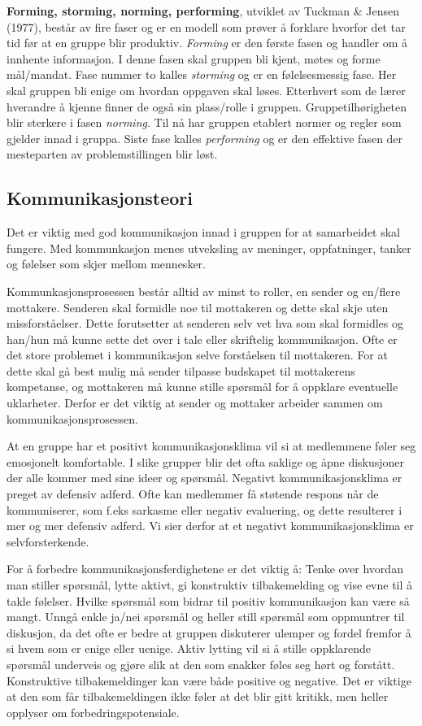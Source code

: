 \textbf{Forming, storming, norming, performing}, utviklet av Tuckman \& Jensen (1977), består av fire faser og er en modell som prøver å forklare hvorfor det tar tid før at en gruppe blir produktiv.
\textit{Forming} er den første fasen og handler om å innhente informasjon. 
I denne fasen skal gruppen bli kjent, møtes og forme mål/mandat.
Fase nummer to kalles \textit{storming} og er en følelsesmessig fase. 
Her skal gruppen bli enige om hvordan oppgaven skal løses. 
Etterhvert som de lærer hverandre å kjenne finner de også sin plass/rolle i gruppen. 
Gruppetilhørigheten blir sterkere i fasen \textit{norming}. 
Til nå har gruppen etablert normer og regler som gjelder innad i gruppa. 
Siste fase kalles \textit{performing} og er den effektive fasen der mesteparten av problemstillingen blir løst. 

\subsection{Kommunikasjonsteori}
Det er viktig med god kommunikasjon innad i gruppen for at samarbeidet skal fungere. 
Med kommunkasjon menes utveksling av meninger, oppfatninger, tanker og følelser som skjer mellom mennesker.

Kommunkasjonsprosessen består alltid av minst to roller, en sender og en/flere mottakere. 
Senderen skal formidle noe til mottakeren og dette skal skje uten missforståelser. 
Dette forutsetter at senderen selv vet hva som skal formidles og han/hun må kunne sette det over i tale eller skriftelig kommunikasjon. 
Ofte er det store problemet i kommunikasjon selve forståelsen til mottakeren. 
For at dette skal gå best mulig må sender tilpasse budskapet til mottakerens kompetanse, og mottakeren må kunne stille spørsmål for å oppklare eventuelle uklarheter. 
Derfor er det viktig at sender og mottaker arbeider sammen om kommunikasjonsprosessen. 

At en gruppe har et positivt kommunikasjonsklima vil si at medlemmene føler seg emosjonelt komfortable. 
I slike grupper blir det ofta saklige og åpne diskusjoner der alle kommer med sine ideer og spørsmål. 
Negativt kommunikasjonsklima er preget av defensiv adferd. 
Ofte kan medlemmer få støtende respons når de kommuniserer, som f.eks sarkasme eller negativ evaluering, og dette resulterer i mer og mer defensiv adferd. 
Vi sier derfor at et negativt kommunikasjonsklima er selvforsterkende. 

For å forbedre kommunikasjonsferdighetene er det viktig å: Tenke over hvordan man stiller spørsmål, lytte aktivt, gi konstruktiv tilbakemelding og vise evne til å takle følelser. 
Hvilke spørsmål som bidrar til positiv kommunikasjon kan være så mangt. 
Unngå enkle ja/nei spørsmål og heller still spørsmål som oppmuntrer til diskusjon, da det ofte er bedre at gruppen diskuterer ulemper og fordel fremfor å si hvem som er enige eller uenige. 
Aktiv lytting vil si å stille oppklarende spørsmål underveis og gjøre slik at den som snakker føles seg hørt og forstått. 
Konstruktive tilbakemeldinger kan være både positive og negative. 
Det er viktige at den som får tilbakemeldingen ikke føler at det blir gitt kritikk, men heller opplyser om forbedringspotensiale. 


